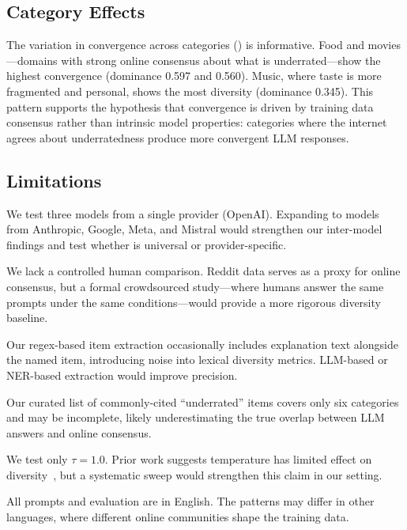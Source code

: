 \subsection{Category Effects}
\label{sec:category_effects}

The variation in convergence across categories () is informative. Food and movies---domains with strong online consensus about what is underrated---show the highest convergence (dominance 0.597 and 0.560). Music, where taste is more fragmented and personal, shows the most diversity (dominance 0.345). This pattern supports the hypothesis that convergence is driven by training data consensus rather than intrinsic model properties: categories where the internet agrees about underratedness produce more convergent LLM responses.

\subsection{Limitations}
\label{sec:limitations}

 We test three models from a single provider (OpenAI). Expanding to models from Anthropic, Google, Meta, and Mistral would strengthen our inter-model findings and test whether \metapop is universal or provider-specific.

 We lack a controlled human comparison. Reddit data serves as a proxy for online consensus, but a formal crowdsourced study---where humans answer the same prompts under the same conditions---would provide a more rigorous diversity baseline.

 Our regex-based item extraction occasionally includes explanation text alongside the named item, introducing noise into lexical diversity metrics. LLM-based or NER-based extraction would improve precision.

 Our curated list of commonly-cited ``underrated'' items covers only six categories and may be incomplete, likely underestimating the true overlap between LLM answers and online consensus.

 We test only $\tau = 1.0$. Prior work suggests temperature has limited effect on diversity~\cite{wu2024generative}, but a systematic sweep would strengthen this claim in our setting.

 All prompts and evaluation are in English. The \metapop patterns may differ in other languages, where different online communities shape the training data.

